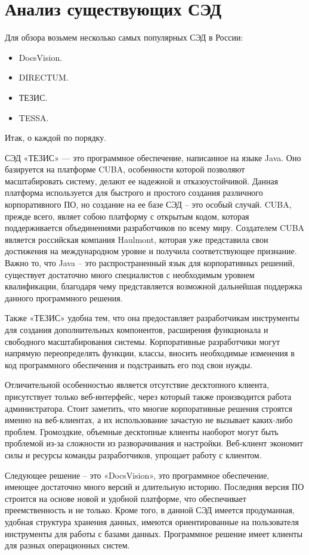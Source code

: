 \section{Анализ существующих СЭД} \label{subsec:ch1/sec2}
Для обзора возьмем несколько самых популярных СЭД в России:
\begin{itemize}
	\item DocsVision.
	\item DIRECTUM.
	\item ТЕЗИС.
	\item TESSA.
\end{itemize}
Итак, о каждой по порядку.

СЭД «ТЕЗИС» — это программное обеспечение, написанное на языке Java. Оно базируется на платформе CUBA, особенности которой позволяют масштабировать систему, делают ее надежной и отказоустойчивой. Данная платформа используется для быстрого и простого создания различного корпоративного ПО, но создание на ее базе СЭД – это особый случай. CUBA, прежде всего, являет собою платформу с открытым кодом, которая поддерживается объединениями разработчиков по всему миру. Создателем CUBA является российская компания Haulmont, которая уже представила свои достижения на международном уровне и получила соответствующее признание. Важно то, что Java – это распространенный язык для корпоративных решений, существует достаточно много специалистов с необходимым уровнем квалификации, благодаря чему представляется возможной дальнейшая поддержка данного программного решения. 

Также «ТЕЗИС» удобна тем, что она предоставляет разработчикам инструменты для создания дополнительных компонентов, расширения функционала и свободного масштабирования системы. Корпоративные разработчики могут напрямую переопределять функции, классы, вносить необходимые изменения в код программного обеспечения и подстраивать его под свои нужды. 

Отличительной особенностью является отсутствие десктопного клиента, присутствует только веб-интерфейс, через который также производится работа администратора. Стоит заметить, что многие корпоративные решения строятся именно на веб-клиентах, а их использование зачастую не вызывает каких-либо проблем. Громоздкие, объемные десктопные клиенты наоборот могут быть проблемой из-за сложности из разворачивания и настройки. Веб-клиент экономит силы и ресурсы команды разработчиков, упрощает работу с клиентом.

Следующее решение – это «DocsVision», это программное обеспечение, имеющее достаточно много версий и длительную историю. Последняя версия ПО строится на основе новой и удобной платформе, что обеспечивает преемственность и не только. Кроме того, в данной СЭД имеется продуманная, удобная структура хранения данных, имеются ориентированные на пользователя инструменты для работы с базами данных. Программное решение имеет клиенты для разных операционных систем. 


